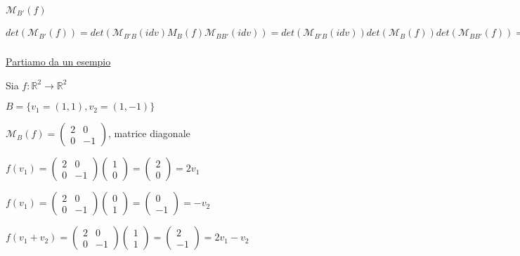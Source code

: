 \documentclass{article}
\newcommand{\hl}[1]{\colorbox{yellow}{#1}}
\newcommand{\ul}[1]{\underline{#1}}
\newcommand{\R}{\mathbb{R}}
\newcommand{\M}{\mathcal{M}}
\begin{document}
$\M_{B'}(f)$


$det(\M_{B'}(f))=det(\M_{B'B}(idv)M_B(f)\M_{BB'}(idv))=det(\M_{B'B}(idv))det(\M_B(f))det(\M_{BB'}(f))=\frac{1}{\bar{det(\M_{BB'}(idv))}}\cdot det(\M_B(f))\cdot\bar{det(\M_{BB'}(idv))}$

\ul{Partiamo da un esempio}

Sia $f:\R^2\rightarrow\R^2$

$B=\{v_1=(1,1),v_2=(1,-1)\}$

$\M_B(f)=\begin{pmatrix}2&0\\0&-1\end{pmatrix}$, matrice diagonale

$f(v_1)=\begin{pmatrix}2&0\\0&-1\end{pmatrix}\begin{pmatrix}1\\0\end{pmatrix}=\begin{pmatrix}2\\0\end{pmatrix}=2v_1$

$f(v_1)=\begin{pmatrix}2&0\\0&-1\end{pmatrix}\begin{pmatrix}0\\1\end{pmatrix}=\begin{pmatrix}0\\-1\end{pmatrix}=-v_2$

$f(v_1+v_2)=\begin{pmatrix}2&0\\0&-1\end{pmatrix}\begin{pmatrix}1\\1\end{pmatrix}=\begin{pmatrix}2\\-1\end{pmatrix}=2v_1-v_2$
\end{document}
